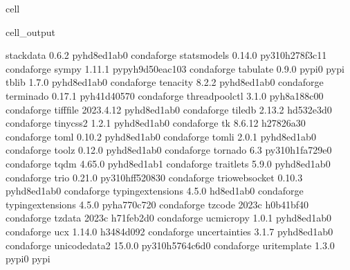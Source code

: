 \documentclass[letterpaper,table,10pt,english]{jupyterBook}
\begin{document}
\begin{sphinxuseclass}{cell}
\begin{sphinxVerbatimOutput}
\begin{sphinxuseclass}{cell_output}
\begin{sphinxVerbatim}[commandchars=\\\{\}]
stack\PYGZus{}data                0.6.2              pyhd8ed1ab\PYGZus{}0    conda\PYGZhy{}forge
statsmodels               0.14.0          py310h278f3c1\PYGZus{}1    conda\PYGZhy{}forge
sympy                     1.11.1          pypyh9d50eac\PYGZus{}103    conda\PYGZhy{}forge
tabulate                  0.9.0                    pypi\PYGZus{}0    pypi
tblib                     1.7.0              pyhd8ed1ab\PYGZus{}0    conda\PYGZhy{}forge
tenacity                  8.2.2              pyhd8ed1ab\PYGZus{}0    conda\PYGZhy{}forge
terminado                 0.17.1             pyh41d4057\PYGZus{}0    conda\PYGZhy{}forge
threadpoolctl             3.1.0              pyh8a188c0\PYGZus{}0    conda\PYGZhy{}forge
tifffile                  2023.4.12          pyhd8ed1ab\PYGZus{}0    conda\PYGZhy{}forge
tiledb                    2.13.2               hd532e3d\PYGZus{}0    conda\PYGZhy{}forge
tinycss2                  1.2.1              pyhd8ed1ab\PYGZus{}0    conda\PYGZhy{}forge
tk                        8.6.12               h27826a3\PYGZus{}0    conda\PYGZhy{}forge
toml                      0.10.2             pyhd8ed1ab\PYGZus{}0    conda\PYGZhy{}forge
tomli                     2.0.1              pyhd8ed1ab\PYGZus{}0    conda\PYGZhy{}forge
toolz                     0.12.0             pyhd8ed1ab\PYGZus{}0    conda\PYGZhy{}forge
tornado                   6.3             py310h1fa729e\PYGZus{}0    conda\PYGZhy{}forge
tqdm                      4.65.0             pyhd8ed1ab\PYGZus{}1    conda\PYGZhy{}forge
traitlets                 5.9.0              pyhd8ed1ab\PYGZus{}0    conda\PYGZhy{}forge
trio                      0.21.0          py310hff52083\PYGZus{}0    conda\PYGZhy{}forge
trio\PYGZhy{}websocket            0.10.3             pyhd8ed1ab\PYGZus{}0    conda\PYGZhy{}forge
typing\PYGZhy{}extensions         4.5.0                hd8ed1ab\PYGZus{}0    conda\PYGZhy{}forge
typing\PYGZus{}extensions         4.5.0              pyha770c72\PYGZus{}0    conda\PYGZhy{}forge
tzcode                    2023c                h0b41bf4\PYGZus{}0    conda\PYGZhy{}forge
tzdata                    2023c                h71feb2d\PYGZus{}0    conda\PYGZhy{}forge
uc\PYGZhy{}micro\PYGZhy{}py               1.0.1              pyhd8ed1ab\PYGZus{}0    conda\PYGZhy{}forge
ucx                       1.14.0               h3484d09\PYGZus{}2    conda\PYGZhy{}forge
uncertainties             3.1.7              pyhd8ed1ab\PYGZus{}0    conda\PYGZhy{}forge
unicodedata2              15.0.0          py310h5764c6d\PYGZus{}0    conda\PYGZhy{}forge
uri\PYGZhy{}template              1.3.0                    pypi\PYGZus{}0    pypi

\end{sphinxVerbatim}
\end{sphinxuseclass}
\end{sphinxVerbatimOutput}
\end{sphinxuseclass}
\end{document}

